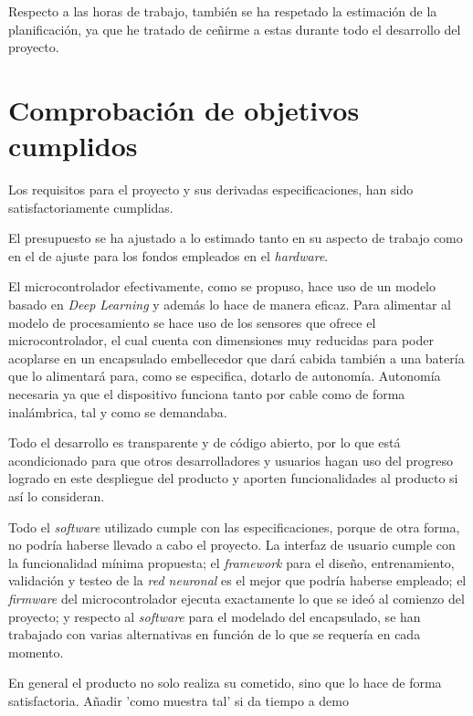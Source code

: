Respecto a las horas de trabajo, también se ha respetado la estimación de
la planificación, ya que he tratado de ceñirme a estas durante todo el desarrollo del
proyecto.

\section{Comprobación de objetivos cumplidos}
Los requisitos para el proyecto y sus derivadas especificaciones, han sido
satisfactoriamente cumplidas.

El presupuesto se ha ajustado a lo estimado tanto en su aspecto de trabajo
como en el de ajuste para los fondos empleados en el \textit{hardware}.

El microcontrolador efectivamente, como se propuso, hace uso de un modelo
basado en \textit{Deep Learning} y además lo hace de manera eficaz. Para
alimentar al modelo de procesamiento se hace uso de los sensores que ofrece
el microcontrolador, el cual cuenta con dimensiones muy reducidas para
poder acoplarse en un encapsulado embellecedor que dará cabida también
a una batería que lo alimentará para, como se especifica, dotarlo de autonomía.
Autonomía necesaria ya que el dispositivo funciona tanto por cable
como de forma inalámbrica, tal y como se demandaba.

Todo el desarrollo es transparente y de código abierto, por lo que
está acondicionado para que otros desarrolladores y usuarios hagan uso del progreso logrado
en este despliegue del producto y aporten funcionalidades al producto
si así lo consideran.

Todo el \textit{software} utilizado cumple con las especificaciones, porque de otra forma,
no podría haberse llevado a cabo el proyecto.
La interfaz de usuario cumple con la funcionalidad mínima propuesta;
el \textit{framework} para el diseño, entrenamiento, validación y testeo
de la \textit{red neuronal} es el mejor que podría haberse empleado;
el \textit{firmware} del microcontrolador ejecuta exactamente lo que
se ideó al comienzo del proyecto; y respecto al \textit{software} para 
el modelado del encapsulado, se han trabajado con varias alternativas
en función de lo que se requería en cada momento.

En general el producto no solo realiza su cometido, sino que lo hace
de forma satisfactoria.
{\color{red} Añadir 'como muestra tal' si da tiempo a demo}